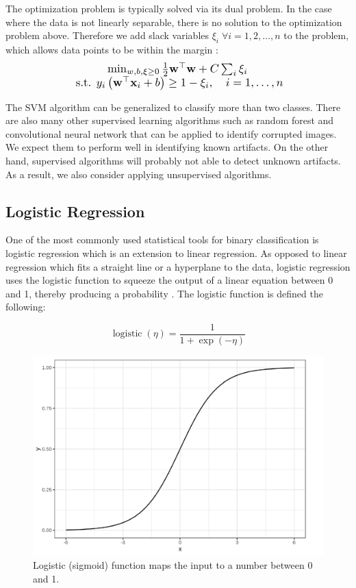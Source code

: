 \noindent The optimization problem is typically solved via its dual problem. In the case where the data is not linearly separable, there is no solution to the optimization problem above. Therefore we add slack variables $\xi_i \; \forall i = 1,2, \ldots, n$ to the problem, which allows data points to be within the margin \cite{soft_svm}:
$$\Scale[1.2]{\begin{array}{c}{\min _{w, b, \xi \geq 0} \frac{1}{2} \mathbf{w}^{\top} \mathbf{w}+C \sum_{i} \xi_{i}} \\ {\text { s.t. } y_{i}\left(\mathbf{w}^{\top} \mathbf{x}_{i}+b\right) \geq 1-\xi_{i}, \quad i=1, \ldots, n}\end{array}}$$

\noindent The SVM algorithm can be generalized to classify more than two classes. There are also many other supervised learning algorithms such as random forest and convolutional neural network that can be applied to identify corrupted images. We expect them to perform well in identifying known artifacts. On the other hand, supervised algorithms will probably not able to detect unknown artifacts. As a result, we also consider applying unsupervised algorithms.


\subsection{Logistic Regression}
One of the most commonly used statistical tools for binary classification is logistic regression which is an extension to linear regression. As opposed to linear regression which fits a straight line or a hyperplane to the data, logistic regression uses the logistic function to squeeze the output of a linear equation between 0 and 1, thereby producing a probability \cite{logistic}. The logistic function is defined the following:

\begin{equation}
\operatorname{logistic}(\eta)=\frac{1}{1+\exp (-\eta)}
\label{logistic}
\end{equation}

\begin{figure}[H]
    \centering
    \includegraphics[scale=0.3]{images/log.png}
    \caption[Logistic Function]{Logistic (sigmoid) function maps the input to a number between 0 and 1.}
    \label{log}
\end{figure}


